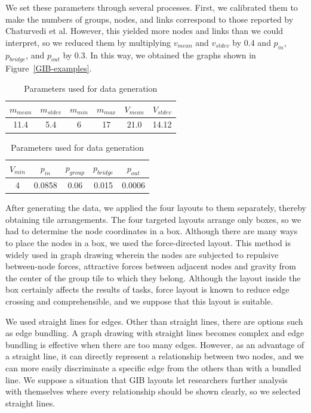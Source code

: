 \documentclass[review]{vgtc}                 %
\begin{document}
We set these parameters through several processes.
First, we calibrated them to make the numbers of groups, nodes, and links correspond to those reported by Chaturvedi et al.
However, this yielded more nodes and links than we could interpret, so we reduced them by multiplying $v_{mean}$ and $v_{stdev}$ by 0.4 and $p_{in}$, $p_{bridge}$, and $p_{out}$ by 0.3.
In this way, we obtained the graphs shown in Figure~\ref{GIB-examples}.

\begin{table}[b]
  \begin{center}
  \caption{Parameters used for data generation}
  \label{parameters}
    \begin{tabular}{|c|c|c|c|c|c|} \hline
      $m_{mean}$ & $m_{stdev}$ & $m_{min}$ & $m_{max}$ & $V_{mean}$ & $V_{stdev}$ \\ \hline 
      11.4 & 5.4 & 6 & 17 & 21.0 & 14.12 \\ \hline
    \end{tabular}
    \begin{tabular}{|c|c|c|c|c|} \hline
      $V_{min}$ & $p_{in}$ & $p_{group}$ & $p_{bridge}$ & $p_{out}$ \\ \hline
      4 & 0.0858 & 0.06 & 0.015 & 0.0006 \\ \hline
    \end{tabular}
  \end{center}
\end{table}

After generating the data, we applied the four layouts to them separately, thereby obtaining tile arrangements.
The four targeted layouts arrange only boxes, so we had to determine the node coordinates in a box.
Although there are many ways to place the nodes in a box, we used the force-directed layout.
This method is widely used in graph drawing wherein the nodes are subjected to repulsive between-node forces, attractive forces between adjacent nodes and gravity from the center of the group tile to which they belong.
Although the layout inside the box certainly affects the results of tasks, force layout is known to reduce edge crossing and comprehensible, and we suppose that this layout is suitable.

We used straight lines for edges.
Other than straight lines, there are options such as edge bundling.
A graph drawing with straight lines becomes complex and edge bundling is effective when there are too many edges.
However, as an advantage of a straight line, it can directly represent a relationship between two nodes, and we can more easily discriminate a specific edge from the others than with a bundled line.
We suppose a situation that GIB layouts let researchers further analysis with themselves where every relationship should be shown clearly, so we selected straight lines.
\end{document}
